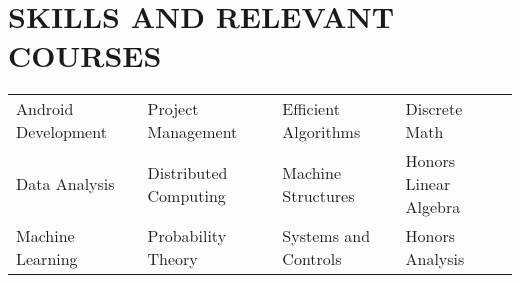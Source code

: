 \documentclass[10pt]{article}
\begin{document}
\section*{SKILLS AND RELEVANT COURSES}
				\setlength{\columnsep}{.5pt}
				\begin{tabu}{X[2c]X[2.1c]X[2c]X[2c]}
					Android Development  & Project Management & Efficient Algorithms & Discrete Math \\
					Data Analysis 			   & Distributed Computing & Machine Structures & Honors Linear Algebra \\
					Machine Learning		   & Probability Theory & Systems and Controls & Honors Analysis \\
				\end{tabu}
 
\end{document}
